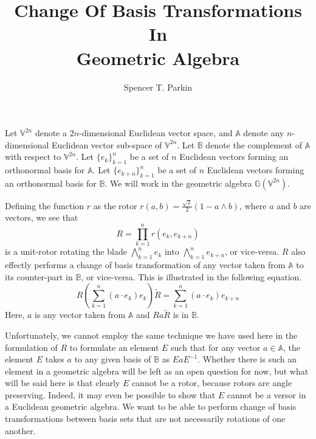 \documentclass[12pt]{article}
\title{Change Of Basis Transformations\\In\\Geometric Algebra}
\author{Spencer T. Parkin}
\newcommand{\G}{\mathbb{G}}
\newcommand{\V}{\mathbb{V}}
\newcommand{\A}{\mathbb{A}}
\newcommand{\B}{\mathbb{B}}
\begin{document}
\maketitle

Let $\V^{2n}$ denote a $2n$-dimensional Euclidean vector space, and
$\A$ denote any $n$-dimensional Euclidean vector sub-space of $\V^{2n}$.
Let $\B$ denote the complement of $\A$ with respect to $\V^{2n}$.
Let $\{e_k\}_{k=1}^n$ be a set of $n$ Euclidean vectors
forming an orthonormal basis for $\A$.  Let $\{e_{k+n}\}_{k=1}^n$
be a set of $n$ Euclidean vectors forming an orthonormal basis for $\B$.
We will work in the geometric algebra $\G(\V^{2n})$.

Defining the function $r$ as the rotor $r(a,b)=\frac{\sqrt{2}}{2}(1-a\wedge b)$, where $a$ and
$b$ are vectors, we see that
\begin{equation*}
R = \prod_{k=1}^n r(e_k,e_{k+n})
\end{equation*}
is a unit-rotor rotating the blade $\bigwedge_{k=1}^n e_k$ into $\bigwedge_{k=1}^n e_{k+n}$, or vice-versa.
$R$ also effectly performs a change of basis transformation of any
vector taken from $\A$ to its counter-part in $\B$, or vice-versa.  This is illustrated in the
following equation.
\begin{equation*}
R\left(\sum_{k=1}^n (a\cdot e_k)e_k\right)\tilde{R} = \sum_{k=1}^n (a\cdot e_k)e_{k+n}
\end{equation*}
Here, $a$ is any vector taken from $\A$ and $Ra\tilde{R}$ is in $\B$.

Unfortunately, we cannot employ the same technique we have used here in the
formulation of $R$ to formulate an element $E$ such that for any vector $a\in\A$,
the element $E$ takes $a$ to any given basis of $\B$ as $EaE^{-1}$.  Whether there
is such an element in a geometric algebra will be left as an open question for now,
but what will be said here is that clearly $E$ cannot be a rotor, because rotors
are angle preserving.  Indeed, it may even be possible to show that $E$ cannot
be a versor in a Euclidean geometric algebra.
We want to be able to perform change of basis transformations
between basis sets that are not necessarily rotations of one another.
\end{document}
